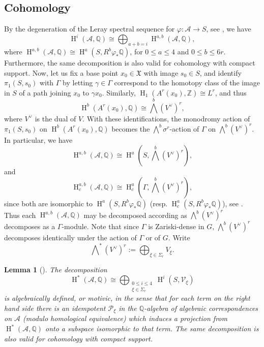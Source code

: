 \documentclass[12pt,a4paper,reqno]{amsart}
\theoremstyle{definition}
\numberwithin{definition}{subsection}
\theoremstyle{definition}
\numberwithin{Definition}{subsection}
\theoremstyle{remark}
\theoremstyle{remark}
\numberwithin{Remark}{subsection}
\theoremstyle{remark}
\theoremstyle{plain}
\numberwithin{Theorem}{subsection}
\theoremstyle{plain}
\theoremstyle{plain}
\theoremstyle{plain}
\theoremstyle{plain}
\newtheorem{Lemma}[Theorem]{Lemma}
\theoremstyle{plain}
\theoremstyle{plain}
\theoremstyle{plain}
\newcommand*{\Z}{\mathbb{Z}}
\newcommand*{\Q}{\mathbb{Q}}
\DeclareMathOperator{\h}{H}
\begin{document}
\subsection{Cohomology}
By the degeneration of the Leray spectral sequence for $\varphi:\mathcal{A}\to S$, see \cite[p. 268]{gordon1}, we have
\[
\h^i(\mathcal{A},\Q)\cong \bigoplus_{a+b=i}\h^{a,b}(\mathcal{A},\Q),
\]
where $\h^{a,b}(\mathcal{A},\Q)\cong \h^a(S, R^b\varphi_*\Q)$, for $0\le a\le 4$ and $0\le b\le 6r$. Furthermore, the same decomposition is also valid for cohomology with compact support.
Now, let us fix a base point $x_0\in \mathfrak{X}$ with image $s_0\in S$, and identify $\pi_1(S,s_0)$ with $\Gamma$ by letting $\gamma\in \Gamma$ correspond to the homotopy class of the image in $S$ of a path joining $x_0$ to $\gamma x_0$. Similarly, $\h_1(A^r(x_0),\Z)\cong L^r$, and thus
\begin{equation}
\label{2.3.3}
\h^b(A^r(x_0),\Q)\cong \bigwedge^b (V^{\vee})^r,
\end{equation}
where $V^\vee$ is the dual of $V$. With these identifications, the monodromy action of $\pi_1(S,s_0)$ on $\h^b(A^r(x_0),\Q)$ becomes the $\bigwedge^b \sigma^r$-action of $\Gamma$ on $\bigwedge ^b (V^{\vee})^r$. In particular, we have
\begin{equation}
\label{2.3.4}
\h^{a,b}(\mathcal{A},\Q)\cong \h^a(S,\bigwedge ^b (V^{\vee})^r),
\end{equation}
and
\[
\h^{a,b}_c(\mathcal{A},\Q)\cong \h^a_c(\Gamma,\bigwedge ^b (V^{\vee})^r),
\]
since both are isomorphic to $\h^a(S, R^b\varphi_*\Q)$ (resp. $\h^a_c(S, R^b\varphi_*\Q)$), see \cite[p. 267]{gordon1}.
 Thus each $\h^{a,b}(\mathcal{A},\Q)$ may be decomposed according as $\bigwedge ^b (V^{\vee})^r$ decomposes as a $\Gamma$-module. Note that since $\Gamma$ is Zariski-dense in $G$, $\bigwedge ^b (V^{\vee})^r$ decomposes identically under the action of $\Gamma$ or of $G$.
Write 
\[
\bigwedge\nolimits^* (V^\vee)^r:=\bigoplus_{\xi\in \Sigma_r} V_\xi.
\]

\begin{Lemma}[]
The decomposition
\[
\h^*(\mathcal{A},\Q)\cong \bigoplus_{\substack{0\le i \le 4\\ \xi\in \Sigma_r}}\h^{i}(S,\mathcal{V}_\xi)
\]
is algebraically defined, or motivic, in the sense that for each term on the right hand side there is an idempotent $\mathcal{P}_\xi$ in the $\Q$-algebra of algebraic correspondences on $\mathcal{A}$ (modulo homological equivalence) which induces a projection from $\h^*(\mathcal{A},\Q)$ onto a subspace isomorphic to that term. The same decomposition is also valid for cohomology with compact support.
\end{Lemma}
\end{document}
